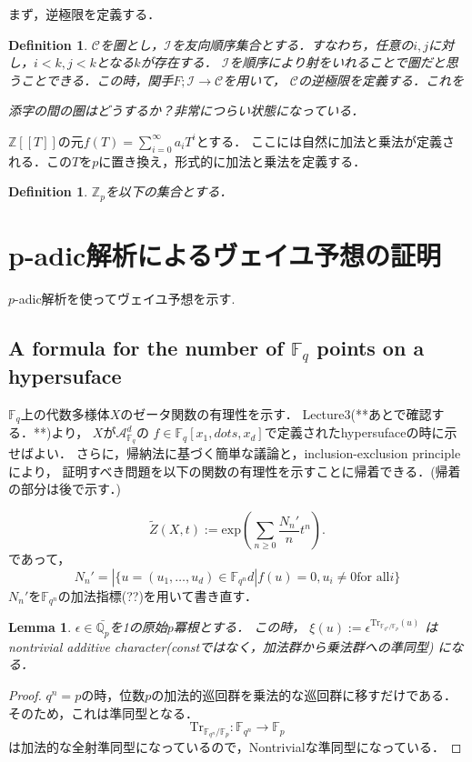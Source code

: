 \documentclass{ujarticle}
\newtheorem{dfn}[thm]{Definition}
\newtheorem{lem}[thm]{Lemma}
\begin{document}
まず，逆極限を定義する．
\begin{dfn}
  $\mathcal{C}$を圏とし，$\mathcal{I}$を友向順序集合とする．すなわち，任意の$i,j$に対し，$i <k,j<k$となる$k$が存在する．
  $\mathcal{I}$を順序により射をいれることで圏だと思うことできる．この時，関手$F;\mathcal{I} \to \mathcal{C}$を用いて，
  $\mathcal{C}$の逆極限を定義する．これを

添字の間の圏はどうするか？非常につらい状態になっている．
\end{dfn}
$\mathbb{Z}[[T]]$の元$f(T)= \sum_{i=0}^{\infty}a_iT^i$とする．
ここには自然に加法と乗法が定義される．この$T$を$p$に置き換え，形式的に加法と乗法を定義する．


\begin{dfn}
 $\mathbb{Z}_p$を以下の集合とする．
\end{dfn}




\section{p-adic解析によるヴェイユ予想の証明}
\label{sec:p-adicによるヴェイユ予想の証明}

$p$-adic解析を使ってヴェイユ予想を示す.
\subsection{A formula for the number of
$\mathbb{F}_q$ points on a hypersuface}
\label{sub:A formula for the number of F_q points on a hypersuface}

$\mathbb{F}_q$上の代数多様体$X$のゼータ関数の有理性を示す．
Lecture3(**あとで確認する．**)より，
$X$が$\mathcal{A}_{\mathbb{F}_q}^d$の
$f \in \mathbb{F}_  q[x_1,dots,x_d]$で定義されたhypersufaceの時に示せばよい．
さらに，帰納法に基づく簡単な議論と，inclusion-exclusion principleにより，
証明すべき問題を以下の関数の有理性を示すことに帰着できる．(帰着の部分は後で示す．)

\begin{equation*}
 \tilde{Z}(X,t):= \mathrm{exp}(\sum_{n \ge 0}\frac{N_n'}{n}t^n).
\end{equation*}
であって，
\begin{equation*}
 N_n'=|\{u= (u_1,\dots,u_d) \in \mathbb{F}_{q^n}d | f(u)=0,u_i \neq 0
 \mbox{for all}i\}
\end{equation*}
$N_n'$を$\mathbb{F}_{q^n}$の加法指標(??)を用いて書き直す．

\begin{lem}
 $ \epsilon \in  \bar{\mathbb{Q}_p}$を1の原始$p$冪根とする．
 この時，
 $\xi(u):=\epsilon^{\mathrm{Tr}_{\mathbb{F}_{q^n}/\mathbb{F}_p}(u)}$
 はnontrivial additive character(constではなく，加法群から乗法群への準同型)
 になる．
\end{lem}
\begin{proof}
$q^n=p$の時，位数$p$の加法的巡回群を乗法的な巡回群に移すだけである．
そのため，これは準同型となる．
\begin{equation*}
  \mathrm{Tr}_{\mathbb{F}_{q^n}/\mathbb{F}_p}:
  \mathbb{F}_{q^n} \to \mathbb{F}_p
\end{equation*}
は加法的な全射準同型になっているので，Nontrivialな準同型になっている．
\end{proof}
\end{document}

